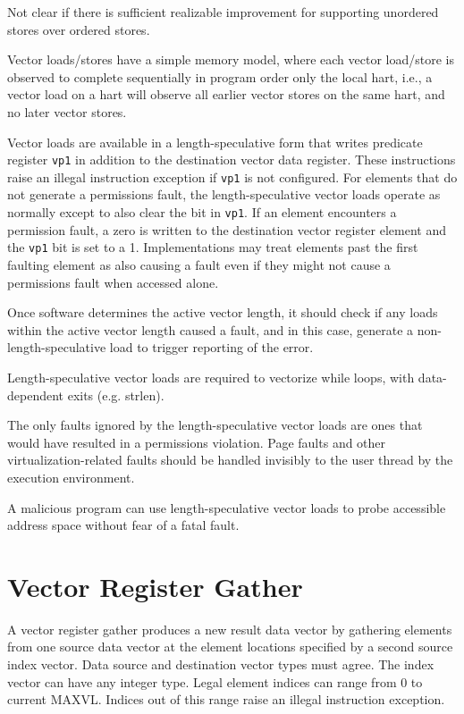 \begin{discussion}
  Not clear if there is sufficient realizable improvement for
  supporting unordered stores over ordered stores.
\end{discussion}

Vector loads/stores have a simple memory model, where each vector
load/store is observed to complete sequentially in program order only
the local hart, i.e., a vector load on a hart will observe all earlier
vector stores on the same hart, and no later vector stores.

Vector loads are available in a length-speculative form that writes
predicate register {\tt vp1} in addition to the destination vector
data register.  These instructions raise an illegal instruction
exception if {\tt vp1} is not configured.  For elements that do not
generate a permissions fault, the length-speculative vector loads
operate as normally except to also clear the bit in {\tt vp1}.  If an
element encounters a permission fault, a zero is written to the
destination vector register element and the {\tt vp1} bit is set to a
1.  Implementations may treat elements past the first faulting element
as also causing a fault even if they might not cause a permissions
fault when accessed alone.

Once software determines the active vector length, it should check if
any loads within the active vector length caused a fault, and in this
case, generate a non-length-speculative load to trigger reporting of
the error.

\begin{commentary}
  Length-speculative vector loads are required to vectorize while
  loops, with data-dependent exits (e.g. strlen).

  The only faults ignored by the length-speculative vector loads are
  ones that would have resulted in a permissions violation.  Page
  faults and other virtualization-related faults should be handled
  invisibly to the user thread by the execution environment.

  A malicious program can use length-speculative vector loads to probe
  accessible address space without fear of a fatal fault.
\end{commentary}

\section{Vector Register Gather}

A vector register gather produces a new result data vector by gathering
elements from one source data vector at the element locations
specified by a second source index vector.  Data source and
destination vector types must agree.  The index vector can have any
integer type.  Legal element indices can range from 0 to current
MAXVL.  Indices out of this range raise an illegal instruction
exception.

